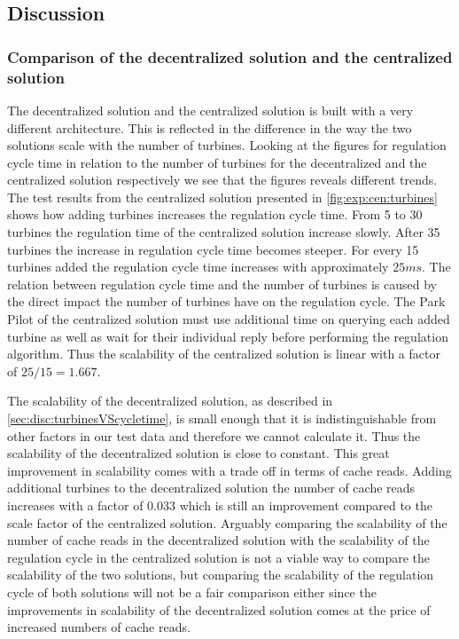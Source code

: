 \subsection{Discussion}
\subsubsection{Comparison of the decentralized solution and the centralized solution}
\label{sec:comp:decentralizedVScentralized}
The decentralized solution and the centralized solution is built with a very different architecture. This is reflected in the difference in the way the two solutions scale with the number of turbines. Looking at the figures for regulation cycle time in relation to the number of turbines for the decentralized and the centralized solution respectively we see that the figures reveals different trends. The test results from the centralized solution presented in \cref{fig:exp:cen:turbines} shows how adding turbines increases the regulation cycle time. From 5 to 30 turbines the regulation time of the centralized solution increase slowly. After 35 turbines the increase in regulation cycle time becomes steeper. For every 15 turbines added the regulation cycle time increases with approximately $25 ms$. The relation between regulation cycle time and the number of turbines is caused by the direct impact the number of turbines have on the regulation cycle. The Park Pilot of the centralized solution must use additional time on querying each added turbine as well as wait for their individual reply before performing the regulation algorithm. Thus the scalability of the centralized solution is linear with a factor of $25 / 15 = 1.667$.

The scalability of the decentralized solution, as described in \cref{sec:disc:turbinesVScycletime}, is small enough that it is indistinguishable from other factors in our test data and therefore we cannot calculate it. Thus the scalability of the decentralized solution is close to constant. This great improvement in scalability comes with a trade off in terms of cache reads. Adding additional turbines to the decentralized solution the number of cache reads increases with a factor of $0.033$ which is still an improvement compared to the scale factor of the centralized solution. Arguably comparing the scalability of the number of cache reads in the decentralized solution with the scalability of the regulation cycle in the centralized solution is not a viable way to compare the scalability of the two solutions, but comparing the scalability of the regulation cycle of both solutions will not be a fair comparison either since the improvements in scalability of the decentralized solution comes at the price of increased numbers of cache reads.

